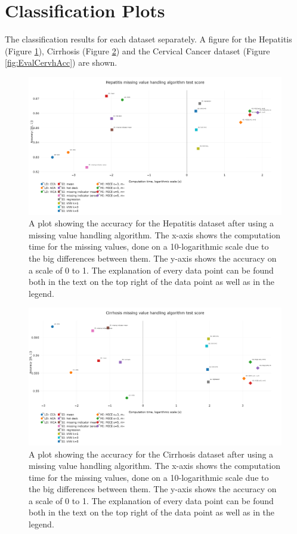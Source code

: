 \documentclass[10pt,a4paper]{report}
\begin{document}
	\section{Classification Plots}
	\label{app:ClassPlots}
	
	The classification results for each dataset separately. A figure for the Hepatitis (Figure \ref{fig:EvalHepaAcc}), Cirrhosis (Figure \ref{fig:EvalCirrhAcc}) and the Cervical Cancer dataset (Figure \ref{fig:EvalCervhAcc}) are shown.
	
	\begin{figure}[H]
		\centering
		\includegraphics[angle=90,height=0.9\textheight]{hepa_acc.PNG}
		\caption{A plot showing the accuracy for the Hepatitis dataset after using a missing value handling algorithm. The x-axis shows the computation time for the missing values, done on a 10-logarithmic scale due to the big differences between them. The y-axis shows the accuracy on a scale of 0 to 1. The explanation of every data point can be found both in the text on the top right of the data point as well as in the legend.}
		\label{fig:EvalHepaAcc}
	\end{figure}
	
	\begin{figure}[H]
		\centering
		\includegraphics[angle=90,height=0.9\textheight]{cirrh_acc.PNG}
		\caption{A plot showing the accuracy for the Cirrhosis dataset after using a missing value handling algorithm. The x-axis shows the computation time for the missing values, done on a 10-logarithmic scale due to the big differences between them. The y-axis shows the accuracy on a scale of 0 to 1. The explanation of every data point can be found both in the text on the top right of the data point as well as in the legend.}
		\label{fig:EvalCirrhAcc}
	\end{figure}
	
\end{document}
